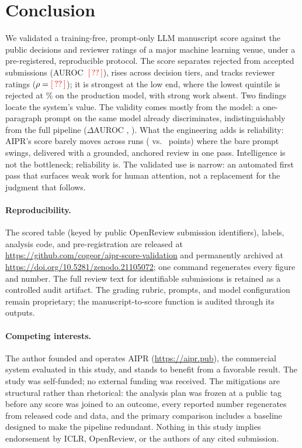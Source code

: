 \section{Conclusion}
\label{sec:conclusion}

We validated a training-free, prompt-only LLM manuscript score against the public
decisions and reviewer ratings of a major machine learning venue, under a
pre-registered, reproducible protocol. The score separates rejected from accepted
submissions (AUROC~$\textcolor{red}{[\,??\,]}$), rises across decision tiers, and tracks reviewer
ratings ($\rho=\textcolor{red}{[\,??\,]}$); it is strongest at the low end, where the lowest
quintile is rejected at \bottomRejectRateFrontier\% on the production model, with strong
work absent. Two findings locate the system's value. The validity comes mostly from the
model: a one-paragraph prompt on the same model already discriminates, indistinguishably
from the full pipeline ($\Delta$AUROC \aurocDiffFullNaive, \aurocDiffPrel). What the
engineering adds is reliability: AIPR's score barely moves across runs (\fullRunSD{}
vs.\ \naiveRunSD{} points) where the bare prompt swings, delivered with a grounded,
anchored review in one pass. Intelligence is not the bottleneck; reliability is. The
validated use is narrow: an automated first pass that surfaces weak work for human
attention, not a replacement for the judgment that follows.

\paragraph{Reproducibility.}
The scored table (keyed by public OpenReview submission identifiers), labels, analysis
code, and pre-registration are released
at \url{https://github.com/cogeor/aipr-score-validation} and permanently archived at
\url{https://doi.org/10.5281/zenodo.21105072}; one command regenerates every figure and
number. The full review text for identifiable
submissions is retained as a controlled audit artifact. The grading rubric, prompts, and
model configuration remain proprietary; the manuscript-to-score function is audited
through its outputs.

\paragraph{Competing interests.}
The author founded and operates AIPR (\url{https://aipr.pub}), the commercial system
evaluated in this study, and stands to benefit from a favorable result. The study was
self-funded; no external funding was received. The mitigations are structural rather
than rhetorical: the analysis plan was frozen at a public tag before any score was
joined to an outcome, every reported number regenerates from released code and data,
and the primary comparison includes a baseline designed to make the pipeline redundant.
Nothing in this study implies endorsement by ICLR, OpenReview, or the authors of any
cited submission.
